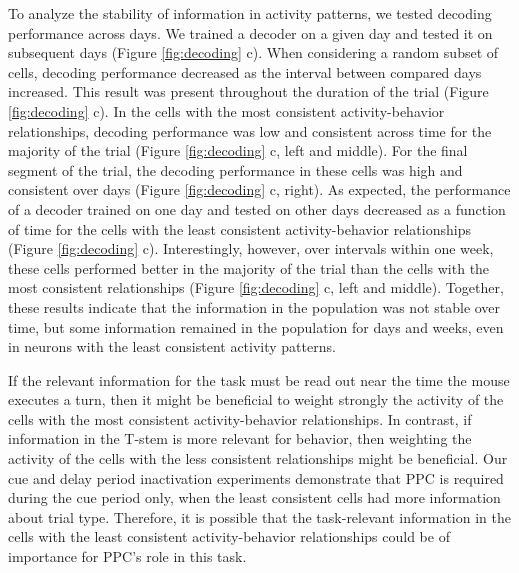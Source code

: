 \bigskip

To analyze the stability of information in activity patterns, we tested decoding performance across days. We trained a decoder on a given day and tested it on subsequent days (Figure \ref{fig:decoding} c). When considering a random subset of cells, decoding performance decreased as the interval between compared days increased. This result was present throughout the duration of the trial (Figure \ref{fig:decoding} c). In the cells with the most consistent activity-behavior relationships, decoding performance was low and consistent across time for the majority of the trial (Figure \ref{fig:decoding} c, left and middle). For the final segment of the trial, the decoding performance in these cells was high and consistent over days (Figure \ref{fig:decoding} c, right). As expected, the performance of a decoder trained on one day and tested on other days decreased as a function of time for the cells with the least consistent activity-behavior relationships (Figure \ref{fig:decoding} c). Interestingly, however, over intervals within one week, these cells performed better in the majority of the trial than the cells with the most consistent relationships (Figure \ref{fig:decoding} c, left and middle). Together, these results indicate that the information in the population was not stable over time, but some information remained in the population for days and weeks, even in neurons with the least consistent activity patterns.

\bigskip

If the relevant information for the task must be read out near the time the mouse executes a turn, then it might be beneficial to weight strongly the activity of the cells with the most consistent activity-behavior relationships. In contrast, if information in the T-stem is more relevant for behavior, then weighting the activity of the cells with the less consistent relationships might be beneficial. Our cue and delay period inactivation experiments demonstrate that PPC is required during the cue period only, when the least consistent cells had more information about trial type. Therefore, it is possible that the task-relevant information in the cells with the least consistent activity-behavior relationships could be of importance for PPC's role in this task.

\bigskip

